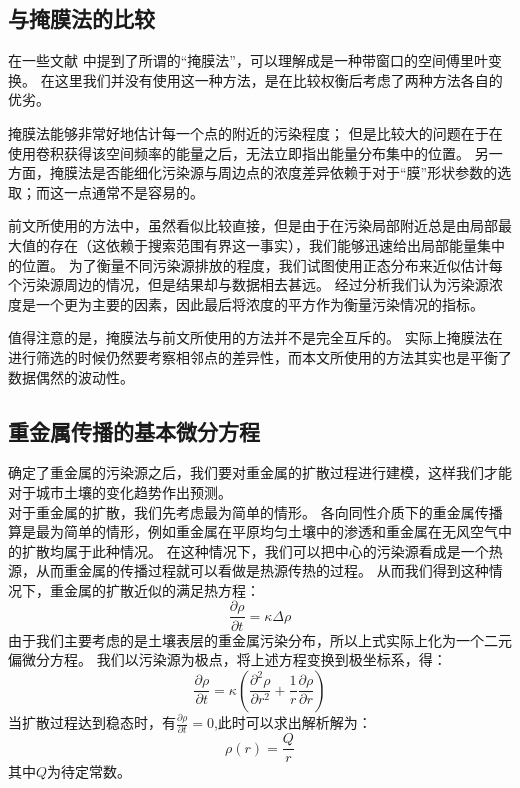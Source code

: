 \documentclass[a4paper]{article}
\begin{document}
\subsection{与掩膜法的比较}
在一些文献 \cite{GEAN:GEAN338} \cite{mitchell_2012} 中提到了所谓的“掩膜法”，可以理解成是一种带窗口的空间傅里叶变换。
在这里我们并没有使用这一种方法，是在比较权衡后考虑了两种方法各自的优劣。

掩膜法能够非常好地估计每一个点的附近的污染程度；
但是比较大的问题在于在使用卷积获得该空间频率的能量之后，无法立即指出能量分布集中的位置。
另一方面，掩膜法是否能细化污染源与周边点的浓度差异依赖于对于“膜”形状参数的选取；而这一点通常不是容易的。

前文所使用的方法中，虽然看似比较直接，但是由于在污染局部附近总是由局部最大值的存在（这依赖于搜索范围有界这一事实），我们能够迅速给出局部能量集中的位置。
为了衡量不同污染源排放的程度，我们试图使用正态分布来近似估计每个污染源周边的情况，但是结果却与数据相去甚远。
经过分析我们认为污染源浓度是一个更为主要的因素，因此最后将浓度的平方作为衡量污染情况的指标。

值得注意的是，掩膜法与前文所使用的方法并不是完全互斥的。
实际上掩膜法在进行筛选的时候仍然要考察相邻点的差异性，而本文所使用的方法其实也是平衡了数据偶然的波动性。

\subsection{重金属传播的基本微分方程}
确定了重金属的污染源之后，我们要对重金属的扩散过程进行建模，这样我们才能对于城市土壤的变化趋势作出预测。  \\
\indent 对于重金属的扩散，我们先考虑最为简单的情形。
各向同性介质下的重金属传播算是最为简单的情形，例如重金属在平原均匀土壤中的渗透和重金属在无风空气中的扩散均属于此种情况。
在这种情况下，我们可以把中心的污染源看成是一个热源，从而重金属的传播过程就可以看做是热源传热的过程。
从而我们得到这种情况下，重金属的扩散近似的满足热方程：
\begin{equation}
\frac{\partial \rho}{\partial t} = \kappa \Delta \rho
\end{equation}
由于我们主要考虑的是土壤表层的重金属污染分布，所以上式实际上化为一个二元偏微分方程。
我们以污染源为极点，将上述方程变换到极坐标系，得：
\begin{equation}
\frac{\partial \rho}{\partial t} = \kappa(\frac{\partial^2 \rho}{\partial r^2}+\frac{1}{r}\frac{\partial \rho}{\partial r})
\end{equation}
当扩散过程达到稳态时，有$\frac{\partial \rho}{\partial t} = 0$,此时可以求出解析解为：
\begin{equation}
\rho(r) = \frac{Q}{r}
\end{equation}
其中$Q$为待定常数。\\
\end{document}
